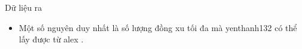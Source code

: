 Dữ liệu ra  
\begin{itemize}
	\item     Một số nguyên duy nhất là số lượng đồng xu tối đa mà    yenthanh132    có thể lấy được từ    alex    .   
\end{itemize}